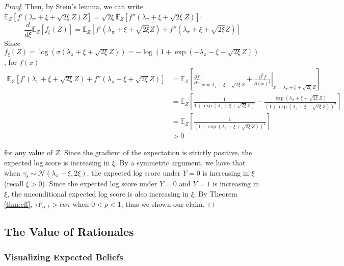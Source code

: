 \documentclass{winnower}
\begin{document}
\begin{proof}
Then, by Stein's lemma, we can write $\mathbb{E}_Z\left[f'(\lambda_\pi + \xi + \sqrt{2\xi}Z) Z \right] = \sqrt{2\xi}\mathbb{E}_Z\left[f''(\lambda_\pi + \xi + \sqrt{2\xi}Z)  \right]$:
{\small
\begin{equation}
    \frac{d}{d\xi} \mathbb{E}_Z\left[f_\xi(Z)\right] =  \mathbb{E}_Z\left[f'(\lambda_\pi + \xi + \sqrt{2\xi}Z) + f''(\lambda_\pi + \xi + \sqrt{2\xi}Z) \right]
\end{equation}
}
Since $f_\xi(Z) = \log\left(\sigma(\lambda_\pi + \xi + \sqrt{2\xi}Z)\right) = -\log\left(1 +\exp{\left(-\lambda_\pi 
-\xi-\sqrt{2\xi}Z\right)}\right)$, for $f(x)$
{\small
\begin{equation}
    \begin{split}
        \mathbb{E}_Z\left[f'(\lambda_\pi + \xi + \sqrt{2\xi}Z) + f''(\lambda_\pi + \xi + \sqrt{2\xi}Z) \right] &= \mathbb{E}_Z\left[\left. \frac{\partial f}{\partial x} \right|_{x = \lambda_\pi + \xi + \sqrt{2\xi}Z} + \left. \frac{\partial^2 f}{\partial (x)^2} \right|_{x = \lambda_\pi + \xi + \sqrt{2\xi}Z}\right] \\
        &= \mathbb{E}_Z\left[\frac{1}{1 + \exp\left(\lambda_\pi + \xi + \sqrt{2\xi}Z\right)} - \frac{\exp(\lambda_\pi + \xi + \sqrt{2\xi}Z)}{\left( 1 + \exp{(\lambda_\pi + \xi + \sqrt{2\xi}Z)}\right)^2}\right] \\
        &=  \mathbb{E}_Z\left[\frac{1}{\left( 1 + \exp{(\lambda_\pi + \xi + \sqrt{2\xi}Z)}\right)^2}\right] \\
        &>0
    \end{split}
\end{equation}
}

for any value of $Z$. Since the gradient of the expectation is strictly positive, the expected log score is increasing in $\xi$. By a symmetric argument, we have that when $\gamma_t \sim \mathcal{N}(\lambda_\pi - {\xi, 2\xi})$, the expected log score under $Y=0$ is increasing in $\xi$ (recall $\xi > 0$). Since the expected log score under $Y=0$ and $Y=1$ is increasing in $\xi$, the unconditional expected log score is also increasing in $\xi$. By Theorem \ref{thm:eff}, $\tau F_{\alpha, t} > tw\tau$ when $0 < \rho < 1$; thus we shown our claim.
\end{proof}

\subsection{The Value of Rationales}\label{app:vis}

\subsubsection{Visualizing Expected Beliefs}\label{app:visbel}
\end{document}
